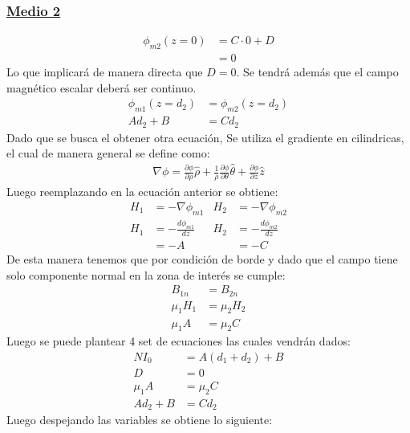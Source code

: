 \documentclass[
  11pt,
  letterpaper,
   addpoints,
   answers
  ]{exam}
\begin{document}
\begin{questions}
\begin{solution}
\begin{enumerate}
        \subsubsection*{\underline{Medio 2}}
        \begin{align}
            \phi_{m2}(z=0)  &= C\cdot 0+ D \\&= 0
        \end{align}
        Lo que implicará de manera directa que $D=0$. Se tendrá además que el campo magnético escalar deberá ser continuo.
        \begin{align}
            \phi_{m1}(z=d_{2}) &=\phi_{m2}(z=d_{2}) \\ A d_{2} + B &= C d_{2} 
        \end{align}
        Dado que se busca el obtener otra ecuación, Se utiliza el gradiente en cilindricas, el cual de manera general se define como:
        \begin{align}
            \nabla \phi = \frac{\partial \phi}{\partial \rho} \hat{\rho} + \frac{1}{\rho}\frac{\partial \phi}{\partial \theta} \hat{\theta} + \frac{\partial \phi}{\partial z} \hat{z}
        \end{align}
        Luego reemplazando en la ecuación anterior se obtiene:
        \begin{align}
            H_{1} &= - \nabla \phi_{m1} &  
            H_{2} &= - \nabla \phi_{m2}\\
             H_{1}&= -\frac{d\phi_{m1}}{dz} &   H_{2}&= -\frac{d\phi_{m2}}{dz}\\
             &= -A  &  &= -C
        \end{align}
        De esta manera tenemos que por condición de borde y dado que el campo tiene solo componente normal en la zona de interés se cumple:
        \begin{align}
            B_{1n} &= B_{2n}\\
            \mu_{1}H_{1} &=  \mu_{2}H_{2}\\
            \mu_{1}A &=  \mu_{2}C   
        \end{align}
        Luego se puede plantear 4 set de ecuaciones las cuales vendrán dados:
        \begin{align}
            NI_{0} &= A(d_{1} + d_{2}) + B\\
            D&=0\\
            \mu_{1}A &=  \mu_{2}C\\
            Ad_{2} + B &= Cd_{2}
        \end{align}
        Luego despejando las variables se obtiene lo siguiente:

\end{enumerate}
\end{solution}
\end{questions}
\end{document}
